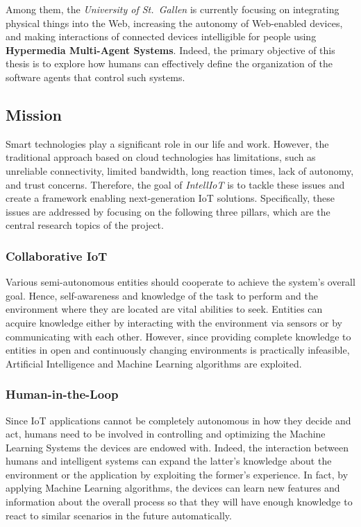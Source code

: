 Among them, the \textit{University of St.\ Gallen} is currently focusing on integrating physical things into the Web, increasing the autonomy of Web-enabled devices, and making interactions of connected devices intelligible for people using \textbf{Hypermedia Multi-Agent Systems}.
Indeed, the primary objective of this thesis is to explore how humans can effectively define the organization of the software agents that control such systems.

\subsection{Mission}
Smart technologies play a significant role in our life and work.
However, the traditional approach based on cloud technologies has limitations, such as unreliable connectivity, limited bandwidth, long reaction times, lack of autonomy, and trust concerns.
Therefore, the goal of \textit{IntellIoT} is to tackle these issues and create a framework enabling next-generation IoT solutions. Specifically, these issues are addressed by focusing on the following three pillars, which are the central research topics of the project.

\subsubsection{Collaborative IoT}
Various semi-autonomous entities should cooperate to achieve the system's overall goal.
Hence, self-awareness and knowledge of the task to perform and the environment where they are located are vital abilities to seek.
Entities can acquire knowledge either by interacting with the environment via sensors or by communicating with each other.
However, since providing complete knowledge to entities in open and continuously changing environments is practically infeasible, Artificial Intelligence and Machine Learning algorithms are exploited.

\subsubsection{Human-in-the-Loop}
Since IoT applications cannot be completely autonomous in how they decide and act, humans need to be involved in controlling and optimizing the Machine Learning Systems the devices are endowed with.
Indeed, the interaction between humans and intelligent systems can expand the latter's knowledge about the environment or the application by exploiting the former's experience.
In fact, by applying Machine Learning algorithms, the devices can learn new features and information about the overall process so that they will have enough knowledge to react to similar scenarios in the future automatically.

